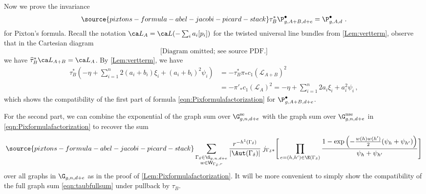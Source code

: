 Now we prove the invariance
\begin{equation} \label{eqn:varying_A_for_P}
\source{pixtons-formula-abel-jacobi-picard-stack}
    \tau_B^* \P_{g,A+B,d+e}^\bullet = \P_{g,A,d}^\bullet\ .
\end{equation}
for Pixton's formula.
Recall the notation $\ca L_A = \ca L(- \sum_i a_i [p_i])$ for the twisted universal line bundles from  \cref{Lem:vertterm}, observe that in the Cartesian diagram
\[
\text{[Diagram omitted; see source PDF.]}
\]
we have $\widehat \tau_B^* \ca L_{A+B} = \ca L_{A}$. By \cref{Lem:vertterm}, we have
\begin{align*}
\tau_B^*(-\eta + \sum_{i=1}^n 2 (a_i+b_i) \xi_i+ (a_i+b_i)^2 \psi_i) &= - \tau_B^*\pi_* c_1(\mathcal{L}_{A+B})^2\\
&=- \pi'_* c_1(\mathcal{L}_{A})^2 = -\eta + \sum_{i=1}^n 2 a_i \xi_i+ a_i^2 \psi_i\, ,
\end{align*}
which shows the compatibility of the first part of formula \eqref{eqn:Pixformulafactorization} for $\P_{g,A+B,d+e}^\bullet$.

For the second part, we can combine the exponential of the graph sum over $\G_{g,n,d+e}^\textup{se}$ with the graph sum over $\G_{g,n,d+e}^\textup{nse}$
in \eqref{eqn:Pixformulafactorization}
to recover the sum
\begin{equation} \label{eqn:taubfullsum}
\source{pixtons-formula-abel-jacobi-picard-stack}
    \sum_{
\substack{\Gamma_\delta\in \G_{g,n,d+e} \\
w\in \mathsf{W}_{\Gamma_\delta,r}}
}
\frac{r^{-h^1(\Gamma_\delta)}}{|\Aut(\Gamma_\delta)| }
\;
j_{\Gamma_\delta*}\Bigg[
\prod_{e=(h,h')\in \E(\Gamma_\delta)}
\frac{1-\exp\left(-\frac{w(h)w(h')}2(\psi_h+\psi_{h'})\right)}{\psi_h + \psi_{h'}} \Bigg]
\end{equation}
over all graphs in $\G_{g,n,d+e}$ as in the proof of \cref{Lem:Pixformulafactorization}. It will be more convenient to simply show the compatibility of the full graph sum \eqref{eqn:taubfullsum} under pullback by $\tau_B$.

